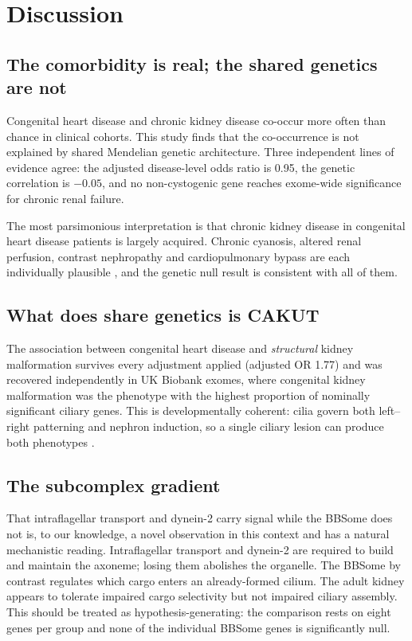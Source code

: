 \documentclass[11pt,a4paper]{article}
\begin{document}
\section{Discussion}

\subsection{The comorbidity is real; the shared genetics are not}

Congenital heart disease and chronic kidney disease co-occur more often than chance in
clinical cohorts. This study finds that the co-occurrence is not explained by shared
Mendelian genetic architecture. Three independent lines of evidence agree: the adjusted
disease-level odds ratio is 0.95, the genetic correlation is $-0.05$, and no non-cystogenic
gene reaches exome-wide significance for chronic renal failure.

The most parsimonious interpretation is that chronic kidney disease in congenital heart
disease patients is largely acquired. Chronic cyanosis, altered renal perfusion, contrast
nephropathy and cardiopulmonary bypass are each individually plausible
\cite{kumar2019,madsen2012}, and the genetic null result is consistent with all of them.

\subsection{What does share genetics is CAKUT}

The association between congenital heart disease and \emph{structural} kidney malformation
survives every adjustment applied (adjusted OR 1.77) and was recovered independently in UK
Biobank exomes, where congenital kidney malformation was the phenotype with the highest
proportion of nominally significant ciliary genes. This is developmentally coherent: cilia
govern both left--right patterning and nephron induction, so a single ciliary lesion can
produce both phenotypes \cite{sanagustin2016,reiter2017}.

\subsection{The subcomplex gradient}

That intraflagellar transport and dynein-2 carry signal while the BBSome does not is, to our
knowledge, a novel observation in this context and has a natural mechanistic reading.
Intraflagellar transport and dynein-2 are required to build and maintain the axoneme; losing
them abolishes the organelle. The BBSome by contrast regulates which cargo enters an
already-formed cilium. The adult kidney appears to tolerate impaired cargo selectivity but
not impaired ciliary assembly. This should be treated as hypothesis-generating: the
comparison rests on eight genes per group and none of the individual BBSome genes is
significantly null.
\end{document}
